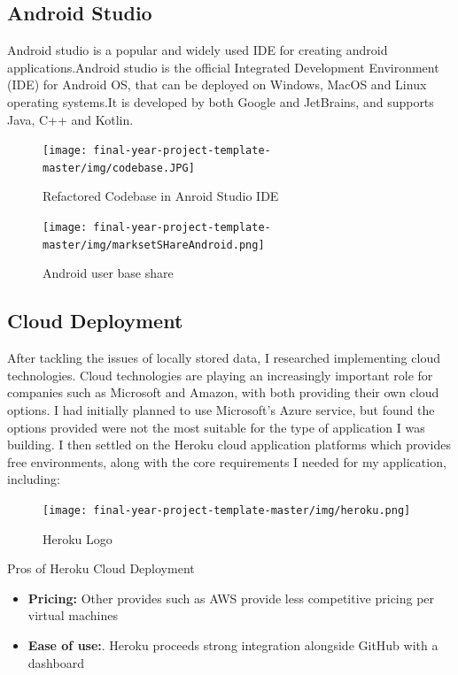 \subsection{Android Studio}
Android studio is a popular and widely  used IDE for creating android applications.Android studio is the official Integrated Development Environment (IDE) for Android OS\cite{androidstudio}, that can be deployed on Windows, MacOS and Linux operating systems.It is developed by both Google and JetBrains, and supports Java, C++ and Kotlin.


   \begin{figure}[H]
  \centering
    \texttt{[image: final-year-project-template-master/img/codebase.JPG]}
     \caption{Refactored Codebase in Anroid Studio IDE}
\end{figure}


   \begin{figure}[H]
  \centering
    \texttt{[image: final-year-project-template-master/img/marksetSHareAndroid.png]}
     \caption{Android user base share}
\end{figure}

\subsection{Cloud Deployment}

After tackling the issues of locally stored data, I researched implementing cloud technologies. Cloud technologies are playing an increasingly important role for companies such as Microsoft and Amazon, with both providing their own cloud options. I had initially planned to use Microsoft’s Azure service, but found the options provided were not the most suitable for the type of application I was building. I then settled on the Heroku cloud application platforms \cite{herokucloud} which provides free environments, along with the core requirements I needed for my application, including: 


\begin{figure}[H]
  \centering
    \texttt{[image: final-year-project-template-master/img/heroku.png]}
     \caption{Heroku Logo}
\end{figure}

Pros of Heroku Cloud Deployment
\begin{itemize}
  \item   \textbf{Pricing:}
 Other provides such as AWS provide less competitive pricing per virtual machines 
  \item \textbf{Ease of use:}.  Heroku proceeds strong integration alongside GitHub with a dashboard 
\end{itemize}


